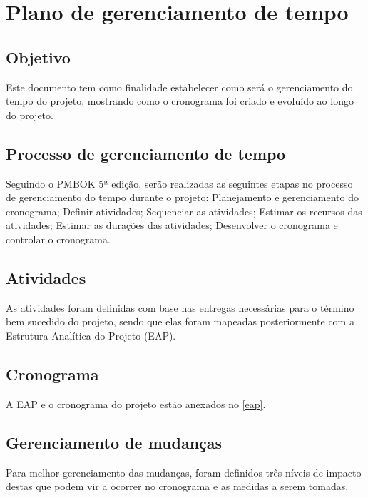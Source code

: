 \section{Plano de gerenciamento de tempo}

\subsection{Objetivo}

  Este documento tem como finalidade estabelecer como será o gerenciamento do tempo do projeto, mostrando como o cronograma foi criado e
  evoluído ao longo do projeto.

\subsection{Processo de gerenciamento de tempo}

  Seguindo o PMBOK 5ª edição, serão realizadas as seguintes etapas no processo de gerenciamento do tempo durante o projeto: Planejamento
  e gerenciamento do cronograma; Definir atividades; Sequenciar as atividades; Estimar os recursos das atividades; Estimar as durações
  das atividades; Desenvolver o cronograma e controlar o cronograma.

\subsection{Atividades}

  As atividades foram definidas com base nas entregas necessárias para o término bem sucedido do projeto, sendo que elas foram mapeadas posteriormente com a Estrutura Analítica do Projeto (EAP).

\subsection{Cronograma}

  A EAP e o cronograma do projeto estão anexados no \ref{eap}.

\subsection{Gerenciamento de mudanças}

  Para melhor gerenciamento das mudanças, foram definidos três níveis de impacto destas que podem vir a ocorrer no cronograma e as
  medidas a serem tomadas.

